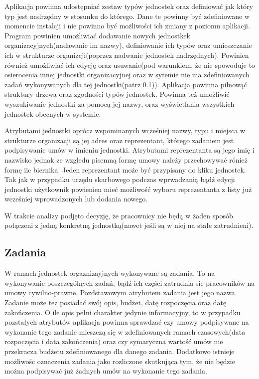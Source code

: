 Aplikacja powinna udostępniać zestaw typów jednostek oraz definiować jak który typ jest nadrzędny w stosunku do którego. Dane te powinny być zdefiniowane w momencie instalcji i nie powinno być możliwości ich zmiany z poziomu aplikacji. Program powinien umożliwiać dodawanie nowych jednostkek organizacyjnych(nadawanie im nazwy), definiowanie ich typów oraz umieszczanie ich w strukturze organizcji(poprzez nadwanie jednostek nadrzędnych). Powinien również umożliwiać ich edycję oraz usuwanie(pod warunkiem, że nie spowoduje to osierocenia innej jednostki organizacyjnej oraz w sytemie nie ma zdefiniowanych zadań wykonywanych dla tej jednostki(patrz \ref{zadania})). Aplikacja powinna pilnowąć struktury drzewa oraz zgodności typów jednostek. Powinna też umożliwić wyszukiwanie jednostki za pomocą jej nazwy, oraz wyświetlania wszystkich jednostek obecnych w systemie.

Atrybutami jednostki oprócz wspominanych wcześniej nazwy, typu i miejsca w strukturze organizacji są jej adres oraz reprezentant, którego zadaniem jest podpisywanie umów w imieniu jednostki. Atrybutami reprezentanta są jego imię i nazwisko jednak ze wzgledu pisemną formę umowy należy przechowywać rónież formę iic biernika. Jeden reprezentant może być przypisany do kliku jednostek. Tak jak w przypadku urzędu skarbowego podczas wprwadzanią bądź edycji jednostki użytkownik powienien mieć możliwość wyboru reprezentanta z listy już wcześniej wprowadzonych lub dodania nowego.

W trakcie analizy podjęto decyzję, że pracownicy nie będą w żaden sposób połączeni z jedną konkretną jednostką(nawet jeśli są w niej na stałe zatrudnieni).

\subsection[Zadania][Zadania]{Zadania}
\label{zadania}
W ramach jednostek orgaznizayjnych wykonywane są zadania. To na wykonywanie poszczególnych zadań, bądź ich części zatrudnia się pracowników na umowy cywilno-prawne. Pozdstawowym atrybutem zadania jest jego nazwa. Zadanie może też posiadać swój opis, budżet, datę rozpoczęcia oraz datę zakończenia. O ile opis pełni charakter jedynie informacyjny, to w przypadku pozstałych atrybutów aplikacja powinna sprawdzać czy umowy podpisywane na wykonanie tego zadanie mieszczą się w zdefiniowanych ramach czasowych(data rozpoczęcia i data zakończenia) oraz czy symaryczna wartość umów nie przekracza budżetu zdefiniowanego dla danego zadania. Dodatkowo istnieje możliwośc oznaczenia zadania jako rozliczone skutkująca tym, że nie będzie można podpisywać już żadnych umów na wykonanie tego zadania. 

